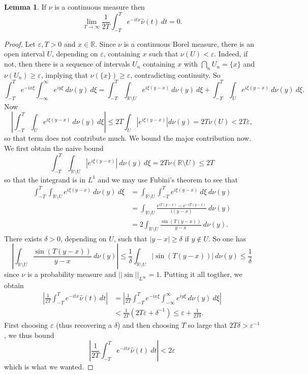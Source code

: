 \documentclass[10pt]{article}
\newcommand{\RR}{\mathbb{R}}
\theoremstyle{definition}
\newtheorem{lemma}{Lemma}[exer]
\begin{document}
\begin{lemma}
If $\nu$ is a continuous measure then
$$\lim_{T \to \infty} \frac{1}{2T} \int_{-T}^T e^{-itx} \hat \nu(t) ~dt = 0.$$
\end{lemma}
\begin{proof}
Let $\varepsilon, T > 0$ and $x \in \RR$.
Since $\nu$ is a continuous Borel measure, there is an open interval $U$, depending on $\varepsilon$, containing $x$ such that $\nu(U) < \varepsilon$.
Indeed, if not, then there is a sequence of intervals $U_n$ containing $x$ with $\bigcap_n U_n = \{x\}$ and $\nu(U_n) \geq \varepsilon$, implying that $\nu(\{x\}) \geq \varepsilon$, contradicting continuity. So
$$\int_{-T}^T e^{-ix\xi} \int_{-\infty}^\infty e^{iy\xi} ~d\nu(y)~d\xi = \int_{-T}^T \int_{\RR \setminus U} e^{i\xi(y-x)}~d\nu(y)~d\xi + \int_{-T}^T \int_U e^{i\xi(y-x)} ~d\nu(y)~d\xi.$$
Now
$$\left|\int_{-T}^T \int_U e^{i\xi(y-x)} ~d\nu(y)~d\xi\right| \leq 2T \int_U |e^{i\xi(y-x)}| d\nu(y) = 2T\nu(U) < 2T\varepsilon,$$
so that term does not contribute much. We bound the major contribution now.
We first obtain the naive bound
$$\int_{-T}^T \int_{\RR \setminus U} |e^{i\xi(y-x)}| ~d\nu(y)~d\xi = 2T \nu(\RR \setminus U) \leq 2T$$
so that the integrand is in $L^1$ and we may use Fubini's theorem to see that
\begin{align*}\int_{-T}^T \int_{\RR \setminus U} e^{i\xi(y-x)}~d\nu(y)~d\xi& = \int_{\RR \setminus U} \int_{-T}^T e^{i\xi(y - x)}~d\xi ~d\nu(y) \\
&= \int_{\RR \setminus U} \frac{e^{iT(y-x)} - e^{-iT(y-x)}}{i(y-x)}~d\nu(y)\\
&= 2\int_{\RR \setminus U} \frac{\sin (T(y-x))}{y - x}~d\nu(y).\end{align*}
There exists $\delta > 0$, depending on $U$, such that $|y - x| \geq \delta$ if $y \notin U$.
So one has
$$\left|\int_{\RR \setminus U} \frac{\sin (T(y-x))}{y - x}~d\nu(y)\right| \leq \frac{1}{\delta} \int_{\RR \setminus U} |\sin(T(y-x))|~d\nu(y) \leq \frac{1}{\delta}$$
since $\nu$ is a probability measure and $||\sin||_{L^\infty} = 1$.
Putting it all togther, we obtain
\begin{align*}
\left|\frac{1}{2T} \int_{-T}^T e^{-itx} \hat \nu(t) ~dt\right| &= \left|\frac{1}{2T}\int_{-T}^T e^{-ix\xi} \int_{-\infty}^\infty e^{iy\xi} ~d\nu(y)~d\xi\right|\\
& < \frac{1}{2T}(2T\varepsilon + \delta^{-1}) \leq \varepsilon + \frac{1}{2T\delta}.
\end{align*}
First choosing $\varepsilon$ (thus recovering a $\delta$) and then choosing $T$ so large that $2T\delta > \varepsilon^{-1}$, we thus bound
$$\left|\frac{1}{2T} \int_{-T}^T e^{-itx} \hat \nu(t) ~dt\right| < 2\varepsilon$$
which is what we wanted.
\end{proof}
\end{document}
